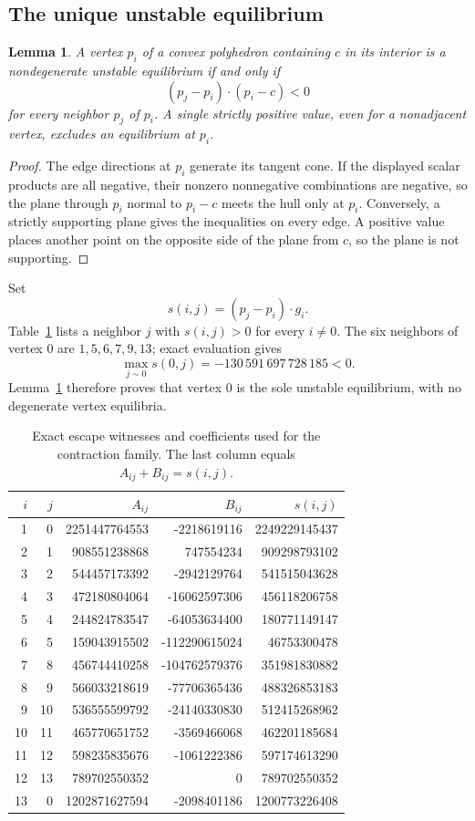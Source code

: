 \documentclass[11pt]{amsart}
\newtheorem{lemma}{Lemma}
\theoremstyle{remark}
\begin{document}
\subsection{The unique unstable equilibrium}
\begin{lemma}\label{lem:vertex}
A vertex $p_i$ of a convex polyhedron containing $c$ in its interior is a nondegenerate unstable equilibrium if and only if
\[
 (p_j-p_i)\cdot(p_i-c)<0
\]
for every neighbor $p_j$ of $p_i$. A single strictly positive value, even for a nonadjacent vertex, excludes an equilibrium at $p_i$.
\end{lemma}
\begin{proof}
The edge directions at $p_i$ generate its tangent cone. If the displayed scalar products are all negative, their nonzero nonnegative combinations are negative, so the plane through $p_i$ normal to $p_i-c$ meets the hull only at $p_i$. Conversely, a strictly supporting plane gives the inequalities on every edge. A positive value places another point on the opposite side of the plane from $c$, so the plane is not supporting.
\end{proof}

Set
\[
 s(i,j)=(p_j-p_i)\cdot g_i.
\]
Table~\ref{tab:witnesses} lists a neighbor $j$ with $s(i,j)>0$ for every $i\ne0$. The six neighbors of vertex $0$ are $1,5,6,7,9,13$; exact evaluation gives
\[
 \max_{j\sim0}s(0,j)=-130\,591\,697\,728\,185<0.
\]
Lemma~\ref{lem:vertex} therefore proves that vertex $0$ is the sole unstable equilibrium, with no degenerate vertex equilibria.

\begin{table}[ht]
\centering
\caption{Exact escape witnesses and coefficients used for the contraction family. The last column equals $A_{ij}+B_{ij}=s(i,j)$.}\label{tab:witnesses}
\small
\begin{tabular}{rrrrr}
\toprule
$i$ & $j$ & $A_{ij}$ & $B_{ij}$ & $s(i,j)$\\
\midrule
1 & 0 & 2251447764553 & -2218619116 & 2249229145437\\
2 & 1 & 908551238868 & 747554234 & 909298793102\\
3 & 2 & 544457173392 & -2942129764 & 541515043628\\
4 & 3 & 472180804064 & -16062597306 & 456118206758\\
5 & 4 & 244824783547 & -64053634400 & 180771149147\\
6 & 5 & 159043915502 & -112290615024 & 46753300478\\
7 & 8 & 456744410258 & -104762579376 & 351981830882\\
8 & 9 & 566033218619 & -77706365436 & 488326853183\\
9 & 10 & 536555599792 & -24140330830 & 512415268962\\
10 & 11 & 465770651752 & -3569466068 & 462201185684\\
11 & 12 & 598235835676 & -1061222386 & 597174613290\\
12 & 13 & 789702550352 & 0 & 789702550352\\
13 & 0 & 1202871627594 & -2098401186 & 1200773226408\\
\bottomrule
\end{tabular}
\end{table}
\end{document}
